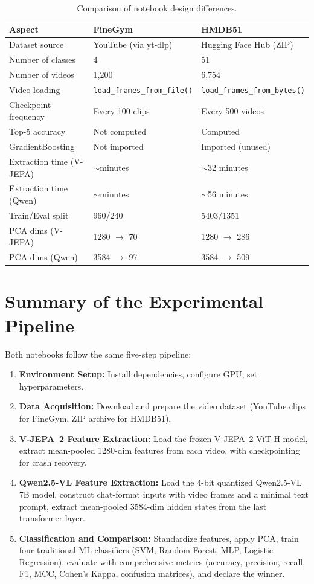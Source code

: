\begin{table}[H]
\centering
\begin{tabular}{p{4.5cm} p{4.5cm} p{4.5cm}}
\toprule
\textbf{Aspect} & \textbf{FineGym} & \textbf{HMDB51} \\
\midrule
Dataset source & YouTube (via yt-dlp) & Hugging Face Hub (ZIP) \\
Number of classes & 4 & 51 \\
Number of videos & 1,200 & 6,754 \\
Video loading & \texttt{load\_frames\_from\_file()} & \texttt{load\_frames\_from\_bytes()} \\
Checkpoint frequency & Every 100 clips & Every 500 videos \\
Top-5 accuracy & Not computed & Computed \\
GradientBoosting & Not imported & Imported (unused) \\
Extraction time (V-JEPA) & $\sim$minutes & $\sim$32 minutes \\
Extraction time (Qwen) & $\sim$minutes & $\sim$56 minutes \\
Train/Eval split & 960/240 & 5403/1351 \\
PCA dims (V-JEPA) & 1280 $\to$ 70 & 1280 $\to$ 286 \\
PCA dims (Qwen) & 3584 $\to$ 97 & 3584 $\to$ 509 \\
\bottomrule
\end{tabular}
\caption{Comparison of notebook design differences.}
\end{table}

\section{Summary of the Experimental Pipeline}

Both notebooks follow the same five-step pipeline:

\begin{enumerate}
  \item \textbf{Environment Setup:} Install dependencies, configure GPU, set hyperparameters.
  \item \textbf{Data Acquisition:} Download and prepare the video dataset (YouTube clips for FineGym, ZIP archive for HMDB51).
  \item \textbf{V-JEPA~2 Feature Extraction:} Load the frozen V-JEPA~2 ViT-H model, extract mean-pooled 1280-dim features from each video, with checkpointing for crash recovery.
  \item \textbf{Qwen2.5-VL Feature Extraction:} Load the 4-bit quantized Qwen2.5-VL 7B model, construct chat-format inputs with video frames and a minimal text prompt, extract mean-pooled 3584-dim hidden states from the last transformer layer.
  \item \textbf{Classification and Comparison:} Standardize features, apply PCA, train four traditional ML classifiers (SVM, Random Forest, MLP, Logistic Regression), evaluate with comprehensive metrics (accuracy, precision, recall, F1, MCC, Cohen's Kappa, confusion matrices), and declare the winner.
\end{enumerate}

